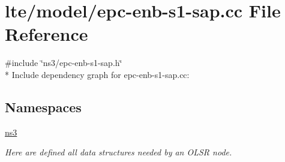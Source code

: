 \hypertarget{epc-enb-s1-sap_8cc}{}\section{lte/model/epc-\/enb-\/s1-\/sap.cc File Reference}
\label{epc-enb-s1-sap_8cc}
{\ttfamily \#include \char`\"{}ns3/epc-\/enb-\/s1-\/sap.\+h\char`\"{}}\\*
Include dependency graph for epc-\/enb-\/s1-\/sap.cc\+:
\subsection*{Namespaces}
\begin{DoxyCompactItemize}
\item 
 \hyperlink{namespacens3}{ns3}
\begin{DoxyCompactList}\small\item\em Here are defined all data structures needed by an O\+L\+SR node. \end{DoxyCompactList}\end{DoxyCompactItemize}
